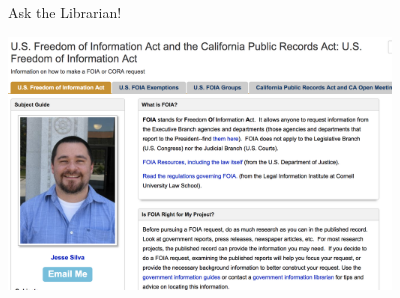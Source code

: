 \documentclass{beamer}
\begin{document}
\begin{frame}{Ask the Librarian!}
\centerline{\includegraphics[width=4in]{./Images/Librarian.PNG}}
\end{frame}
\end{document}
